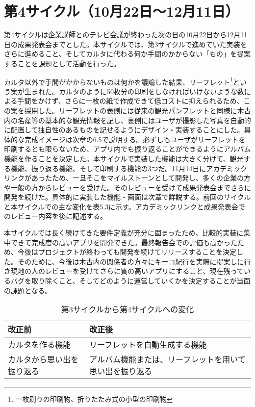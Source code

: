 \section{第4サイクル（10月22日～12月11日）}
第4サイクルは企業講師とのテレビ会議が終わった次の日の10月22日から12月11日の成果発表会までとした。本サイクルでは、第3サイクルで進めていた実装をさらに進めること、そしてカルタに代わる何か手間のかからない「もの」を提案することを課題として活動を行った。
\par カルタ以外で手間がかからないものは何かを議論した結果、リーフレット\footnote{一枚刷りの印刷物、折りたたみ式の小型の印刷物}という案が生まれた。カルタのように50枚分の印刷をしなければいけないような数による手間をかけず、さらに一枚の紙で作成できて低コストに抑えられるため、この案を採用した。リーフレットの表側には従来の観光パンフレットと同様に木古内の名産等の基本的な観光情報を記し、裏側にはユーザが撮影した写真を自動的に配置して独自性のあるものを記せるようにデザイン・実装することにした。具体的な完成イメージは次章の6.5で説明する。必ずしもユーザがリーフレットを印刷するとも限らないため、アプリ内でも振り返ることができるようにアルバム機能を作ることを決定した。本サイクルで実装した機能は大きく分けて、観光する機能、振り返る機能、そして印刷する機能の3つだ。11月14日にアカデミックリンクがあったため、一旦そこをマイルストーンとして開発し、多くの企業の方や一般の方からレビューを受けた。そのレビューを受けて成果発表会までさらに開発を続けた。具体的に実装した機能・画面は次章で詳説する。前回のサイクルと本サイクルでの主な変化を表5.3に示す。アカデミックリンクと成果発表会でのレビュー内容を後に記述する。
\par 本サイクルでは長く続けてきた要件定義が充分に固まったため、比較的実装に集中できて完成度の高いアプリを開発できた。最終報告会での評価も高かったため、今後はプロジェクトが終わっても開発を続けてリリースすることを決定した。そのために、今後は木古内の関係者の方々にキーコ紀行を実際に提案しに行き現地の人のレビューを受けてさらに質の高いアプリにすること、現在残っているバグを取り除くこと、そしてどのように運営していくかを決定することが当面の課題となる。

\begin{table}[htb]
\centering
\addtocounter{table}{+0}
\caption{第3サイクルから第4サイクルへの変化}
  \begin{tabular}{|l|l|} \hline
    改正前&改正後  \\ \hline 
    カルタを作る機能 & \parbox{20zw}{リーフレットを自動生成する機能} \\  \hline
    カルタから思い出を振り返る &\parbox{20zw}{アルバム機能または、リーフレットを用いて思い出を振り返る}\rule[-6mm]{0mm}{14mm}\\ \hline
  \end{tabular} 
\end{table}


